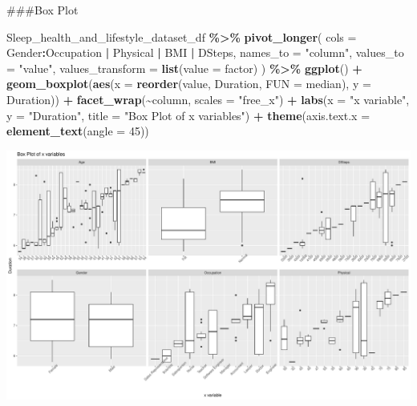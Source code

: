 \documentclass[
  11pt,
]{article}
\newenvironment{Shaded}{\begin{snugshade}}{\end{snugshade}}
\newcommand{\AttributeTok}[1]{\textcolor[rgb]{0.13,0.29,0.53}{#1}}
\newcommand{\DecValTok}[1]{\textcolor[rgb]{0.00,0.00,0.81}{#1}}
\newcommand{\FunctionTok}[1]{\textcolor[rgb]{0.13,0.29,0.53}{\textbf{#1}}}
\newcommand{\NormalTok}[1]{#1}
\newcommand{\SpecialCharTok}[1]{\textcolor[rgb]{0.81,0.36,0.00}{\textbf{#1}}}
\newcommand{\StringTok}[1]{\textcolor[rgb]{0.31,0.60,0.02}{#1}}
\begin{document}
\#\#\#Box Plot

\begin{Shaded}
\begin{Highlighting}[]
\NormalTok{Sleep\_health\_and\_lifestyle\_dataset\_df }\SpecialCharTok{\%\textgreater{}\%}
  \FunctionTok{pivot\_longer}\NormalTok{(}
    \AttributeTok{cols =}\NormalTok{ Gender}\SpecialCharTok{:}\NormalTok{Occupation }\SpecialCharTok{|}\NormalTok{ Physical }\SpecialCharTok{|}\NormalTok{ BMI }\SpecialCharTok{|}\NormalTok{ DSteps,}
    \AttributeTok{names\_to =} \StringTok{"column"}\NormalTok{,}
    \AttributeTok{values\_to =} \StringTok{"value"}\NormalTok{,}
    \AttributeTok{values\_transform =} \FunctionTok{list}\NormalTok{(}\AttributeTok{value =} \StringTok{\textquotesingle{}factor\textquotesingle{}}\NormalTok{)}
\NormalTok{) }\SpecialCharTok{\%\textgreater{}\%}
\FunctionTok{ggplot}\NormalTok{() }\SpecialCharTok{+}
  \FunctionTok{geom\_boxplot}\NormalTok{(}\FunctionTok{aes}\NormalTok{(}\AttributeTok{x =} \FunctionTok{reorder}\NormalTok{(value, Duration, }\AttributeTok{FUN =}\NormalTok{ median), }\AttributeTok{y =}\NormalTok{ Duration)) }\SpecialCharTok{+}
  \FunctionTok{facet\_wrap}\NormalTok{(}\SpecialCharTok{\textasciitilde{}}\NormalTok{column, }\AttributeTok{scales =} \StringTok{"free\_x"}\NormalTok{) }\SpecialCharTok{+}
  \FunctionTok{labs}\NormalTok{(}\AttributeTok{x =} \StringTok{"x variable"}\NormalTok{, }\AttributeTok{y =} \StringTok{"Duration"}\NormalTok{, }\AttributeTok{title =} \StringTok{"Box Plot of x variables"}\NormalTok{) }\SpecialCharTok{+}
  \FunctionTok{theme}\NormalTok{(}\AttributeTok{axis.text.x =} \FunctionTok{element\_text}\NormalTok{(}\AttributeTok{angle =} \DecValTok{45}\NormalTok{))}
\end{Highlighting}
\end{Shaded}

\begin{center}\includegraphics[width=0.7\linewidth]{SleepHelath_files/figure-latex/unnamed-chunk-61-1} \end{center}
\end{document}
